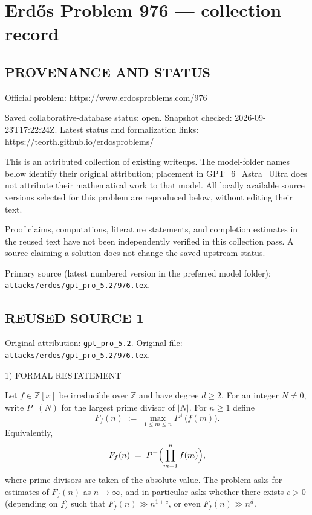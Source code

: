 \section*{Erd\H{o}s Problem 976 --- collection record}

\subsection*{PROVENANCE AND STATUS}
Official problem: https://www.erdosproblems.com/976

Saved collaborative-database status: open.
Snapshot checked: 2026-09-23T17:22:24Z.
Latest status and formalization links: https://teorth.github.io/erdosproblems/

This is an attributed collection of existing writeups. The model-folder names below identify their original attribution; placement in GPT\_6\_Astra\_Ultra does not attribute their mathematical work to that model. All locally available source versions selected for this problem are reproduced below, without editing their text.

Proof claims, computations, literature statements, and completion estimates in the reused text have not been independently verified in this collection pass. A source claiming a solution does not change the saved upstream status.

Primary source (latest numbered version in the preferred model folder): \texttt{attacks/erdos/gpt\_pro\_5.2/976.tex}.

\subsection*{REUSED SOURCE 1}
Original attribution: \texttt{gpt\_pro\_5.2}.
Original file: \texttt{attacks/erdos/gpt\_pro\_5.2/976.tex}.



1) FORMAL RESTATEMENT

Let $f\in\mathbb Z[x]$ be irreducible over $\mathbb Z$ and have degree $d\ge 2$.
For an integer $N\ne 0$, write $P^+(N)$ for the largest prime divisor of $|N|$.
For $n\ge 1$ define
\[
F_f(n)\;:=\;\max_{1\le m\le n} P^+\bigl(f(m)\bigr).
\]
Equivalently,
\[
F_f(n)\;=\; P^+\Bigl(\prod_{m=1}^n f(m)\Bigr),
\]
where prime divisors are taken of the absolute value.
The problem asks for estimates of $F_f(n)$ as $n\to\infty$, and in particular asks whether
there exists $c>0$ (depending on $f$) such that $F_f(n)\gg n^{1+c}$, or even $F_f(n)\gg n^d$.

